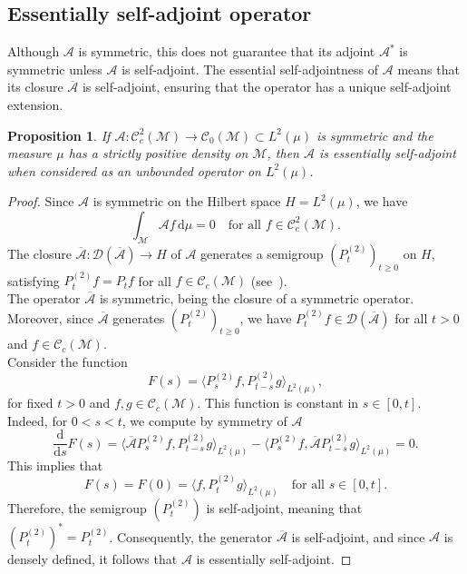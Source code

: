 \documentclass[10pt,a4paper]{article}
\newcommand\cA{\mathcal{A}}
\newcommand{\PAR}[1]{{{\left(#1\right)}}} %
\newtheorem{proposition}[theorem]{Proposition}
\begin{document}
{\subsection{Essentially self-adjoint operator}\label{appendix:selfadjoint}
Although $\mathcal{A}$ is symmetric, this does not guarantee that its adjoint $\mathcal{A}^*$ is symmetric unless $\mathcal{A}$ is self-adjoint. The essential self-adjointness of $\mathcal{A}$ means that its closure $\overline{\mathcal{A}}$ is self-adjoint, ensuring that the operator has a unique self-adjoint extension. 
\begin{proposition}
    \label{prop:essential_self_adjointness}
    If $\mathcal{A}: \mathcal{C}^2_c(\mathcal{M}) \rightarrow \mathcal{C}_0(\mathcal{M}) \subset L^2(\mu)$ is symmetric and the measure $\mu$ has a strictly positive density on $\mathcal{M}$, then $\mathcal{A}$ is essentially self-adjoint when considered as an unbounded operator on $L^2(\mu)$.
\end{proposition}
\begin{proof}
    Since $\mathcal{A}$ is symmetric on the Hilbert space $H = L^2(\mu)$, we have
    \[
        \int_{\mathcal{M}} \mathcal{A} f \, \mathrm{d}\mu = 0 \quad \text{for all } f \in \mathcal{C}^2_c(\mathcal{M}).
    \]
    The closure $\overline{\mathcal{A}}: \mathcal{D}(\overline{\mathcal{A}}) \rightarrow H$ of $\mathcal{A}$ generates a semigroup $(P_t^{(2)})_{t \ge 0}$ on $H$, satisfying $P_t^{(2)} f = P_t f$ for all $f \in \mathcal{C}_c(\mathcal{M})$ (see~\cite[Theorem 1.5.38]{toan-thesis}).
\\
    The operator $\overline{\mathcal{A}}$ is symmetric, being the closure of a symmetric operator. Moreover, since $\overline{\mathcal{A}}$ generates $(P_t^{(2)})_{t \ge 0}$, we have $P_t^{(2)} f \in \mathcal{D}(\overline{\mathcal{A}})$ for all $t > 0$ and $f \in \mathcal{C}_c(\mathcal{M})$.
\\
    Consider the function
    \[
        F(s) = \langle P_s^{(2)} f, P_{t - s}^{(2)} g \rangle_{L^2(\mu)},
    \]
    for fixed $t > 0$ and $f, g \in \mathcal{C}_c(\mathcal{M})$. This function is constant in $s \in [0, t]$. Indeed, for $0 < s < t$, we compute by symmetry of $\cA$
    \[
        \frac{\mathrm{d}}{\mathrm{d} s} F(s) = \langle \overline{\mathcal{A}} P_s^{(2)} f, P_{t - s}^{(2)} g \rangle_{L^2(\mu)} - \langle P_s^{(2)} f, \overline{\mathcal{A}} P_{t - s}^{(2)} g \rangle_{L^2(\mu)} = 0.
    \]
    This implies that
    \[
        F(s) = F(0) = \langle f, P_t^{(2)} g \rangle_{L^2(\mu)} \quad \text{for all } s \in [0, t].
    \]
    Therefore, the semigroup $(P_t^{(2)})$ is self-adjoint, meaning that $\PAR{P_t^{(2)}}^* = P_t^{(2)}$. Consequently, the generator $\overline{\mathcal{A}}$ is self-adjoint, and since $\mathcal{A}$ is densely defined, it follows that $\mathcal{A}$ is essentially self-adjoint.
\end{proof}
}
\end{document}
